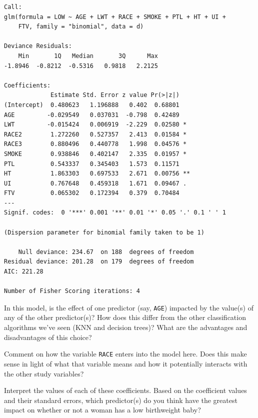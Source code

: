 {\small
\begin{verbatim}
Call:
glm(formula = LOW ~ AGE + LWT + RACE + SMOKE + PTL + HT + UI + 
    FTV, family = "binomial", data = d)

Deviance Residuals: 
    Min       1Q   Median       3Q      Max  
-1.8946  -0.8212  -0.5316   0.9818   2.2125  

Coefficients:
             Estimate Std. Error z value Pr(>|z|)   
(Intercept)  0.480623   1.196888   0.402  0.68801   
AGE         -0.029549   0.037031  -0.798  0.42489   
LWT         -0.015424   0.006919  -2.229  0.02580 * 
RACE2        1.272260   0.527357   2.413  0.01584 * 
RACE3        0.880496   0.440778   1.998  0.04576 * 
SMOKE        0.938846   0.402147   2.335  0.01957 * 
PTL          0.543337   0.345403   1.573  0.11571   
HT           1.863303   0.697533   2.671  0.00756 **
UI           0.767648   0.459318   1.671  0.09467 . 
FTV          0.065302   0.172394   0.379  0.70484   
---
Signif. codes:  0 '***' 0.001 '**' 0.01 '*' 0.05 '.' 0.1 ' ' 1

(Dispersion parameter for binomial family taken to be 1)

    Null deviance: 234.67  on 188  degrees of freedom
Residual deviance: 201.28  on 179  degrees of freedom
AIC: 221.28

Number of Fisher Scoring iterations: 4
\end{verbatim}
}

\begin{question}{}
In this model, is the effect of one predictor (say, \verb|AGE|) impacted by the value(s) of any of the other predictor(s)? How does this differ from the other classification algorithms we've seen (KNN and decision trees)? What are the advantages and disadvantages of this choice? 
\end{question}

\begin{question}{}
Comment on how the variable \texttt{RACE} enters into the model here. Does this make sense in light of what that variable means and how it potentially interacts with the other study variables?
\end{question}

\begin{question}{}
Interpret the values of each of these coefficients. Based on the coefficient values and their standard errors, which predictor(s) do you think have the greatest impact on whether or not a woman has a low birthweight baby? 
\end{question}

